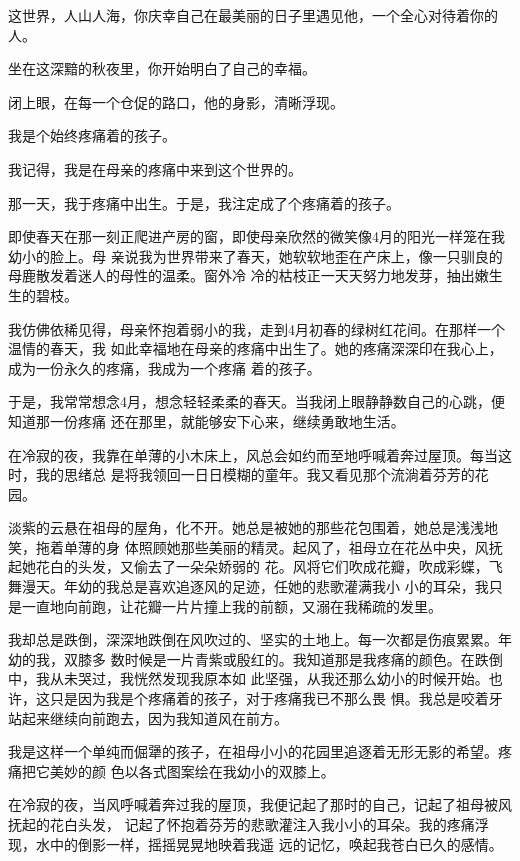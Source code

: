		这世界，人山人海，你庆幸自己在最美丽的日子里遇见他，一个全心对待着你的人。

		坐在这深黯的秋夜里，你开始明白了自己的幸福。

		闭上眼，在每一个仓促的路口，他的身影，清晰浮现。

	\endwriting



		我是个始终疼痛着的孩子。

		我记得，我是在母亲的疼痛中来到这个世界的。

		那一天，我于疼痛中出生。于是，我注定成了个疼痛着的孩子。

		即使春天在那一刻正爬进产房的窗，即使母亲欣然的微笑像4月的阳光一样笼在我幼小的脸上。母
	亲说我为世界带来了春天，她软软地歪在产床上，像一只驯良的母鹿散发着迷人的母性的温柔。窗外冷
	冷的枯枝正一天天努力地发芽，抽出嫩生生的碧枝。

		我仿佛依稀见得，母亲怀抱着弱小的我，走到4月初春的绿树红花间。在那样一个温情的春天，我
	如此幸福地在母亲的疼痛中出生了。她的疼痛深深印在我心上，成为一份永久的疼痛，我成为一个疼痛
	着的孩子。

		于是，我常常想念4月，想念轻轻柔柔的春天。当我闭上眼静静数自己的心跳，便知道那一份疼痛
	还在那里，就能够安下心来，继续勇敢地生活。

		在冷寂的夜，我靠在单薄的小木床上，风总会如约而至地呼喊着奔过屋顶。每当这时，我的思绪总
	是将我领回一日日模糊的童年。我又看见那个流淌着芬芳的花园。

		淡紫的云悬在祖母的屋角，化不开。她总是被她的那些花包围着，她总是浅浅地笑，拖着单薄的身
	体照顾她那些美丽的精灵。起风了，祖母立在花丛中央，风抚起她花白的头发，又偷去了一朵朵娇弱的
	花。风将它们吹成花瓣，吹成彩蝶，飞舞漫天。年幼的我总是喜欢追逐风的足迹，任她的悲歌灌满我小
	小的耳朵，我只是一直地向前跑，让花瓣一片片撞上我的前额，又溺在我稀疏的发里。

		我却总是跌倒，深深地跌倒在风吹过的、坚实的土地上。每一次都是伤痕累累。年幼的我，双膝多
	数时候是一片青紫或殷红的。我知道那是我疼痛的颜色。在跌倒中，我从未哭过，我恍然发现我原本如
	此坚强，从我还那么幼小的时候开始。也许，这只是因为我是个疼痛着的孩子，对于疼痛我已不那么畏
	惧。我总是咬着牙站起来继续向前跑去，因为我知道风在前方。

		我是这样一个单纯而倔犟的孩子，在祖母小小的花园里追逐着无形无影的希望。疼痛把它美妙的颜
	色以各式图案绘在我幼小的双膝上。

		在冷寂的夜，当风呼喊着奔过我的屋顶，我便记起了那时的自己，记起了祖母被风抚起的花白头发，
	记起了怀抱着芬芳的悲歌灌注入我小小的耳朵。我的疼痛浮现，水中的倒影一样，摇摇晃晃地映着我遥
	远的记忆，唤起我苍白已久的感情。

